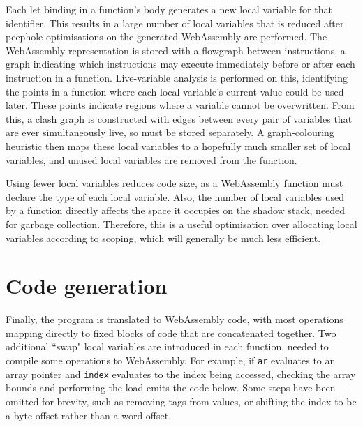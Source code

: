 Each let binding in a function's body generates a new local variable for that identifier. This results in a large number of local variables that is reduced after peephole optimisations on the generated WebAssembly are performed. 
The WebAssembly representation is stored with a flowgraph between instructions, a graph indicating which instructions may execute immediately before or after each instruction in a function. 
Live-variable analysis is performed on this, identifying the points in a function where each local variable's current value could be used later. These points indicate regions where a variable cannot be overwritten. From this, a clash graph is constructed with edges between every pair of variables that are ever simultaneously live, so must be stored separately. A graph-colouring heuristic then maps these local variables to a hopefully much smaller set of local variables, and unused local variables are removed from the function.

Using fewer local variables reduces code size, as a WebAssembly function must declare the type of each local variable.
Also, the number of local variables used by a function directly affects the space it occupies on the shadow stack, needed for garbage collection. Therefore, this is a useful optimisation over allocating local variables according to scoping, which will generally be much less efficient.


\section{Code generation}

Finally, the program is translated to WebAssembly code, with most operations mapping directly to fixed blocks of code that are concatenated together. 
%
Two additional ``swap" local variables are introduced in each function, needed to compile some operations to WebAssembly. 
For example, if \verb|ar| evaluates to an array pointer and \verb|index| evaluates to the index being accessed, checking the array bounds and performing the load emits the code below. Some steps have been omitted for brevity, such as removing tags from values, or shifting the index to be a byte offset rather than a word offset.

